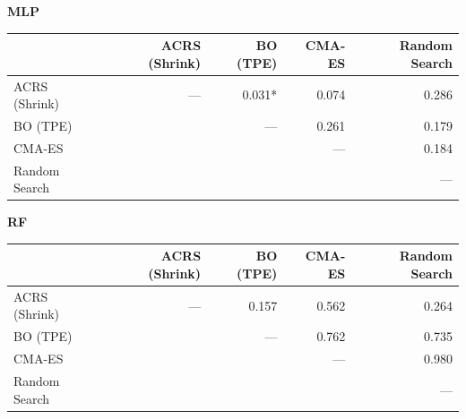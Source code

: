 \textbf{MLP}\\
\begin{tabular}{lrrrr}
\toprule
 & ACRS (Shrink) & BO (TPE) & CMA-ES & Random Search \\
\midrule
ACRS (Shrink) & — & 0.031* & 0.074 & 0.286 \\
BO (TPE) &  & — & 0.261 & 0.179 \\
CMA-ES &  &  & — & 0.184 \\
Random Search &  &  &  & — \\
\bottomrule
\end{tabular}
\bigskip

\textbf{RF}\\
\begin{tabular}{lrrrr}
\toprule
 & ACRS (Shrink) & BO (TPE) & CMA-ES & Random Search \\
\midrule
ACRS (Shrink) & — & 0.157 & 0.562 & 0.264 \\
BO (TPE) &  & — & 0.762 & 0.735 \\
CMA-ES &  &  & — & 0.980 \\
Random Search &  &  &  & — \\
\bottomrule
\end{tabular}
\bigskip

